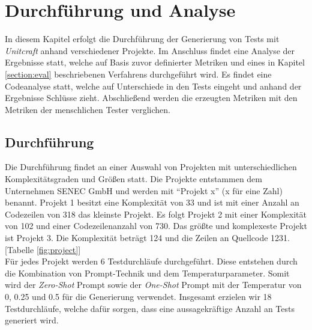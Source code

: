 \chapter{Durchführung und Analyse}
In diesem Kapitel erfolgt die Durchführung der Generierung von Tests mit \textit{Unitcraft} anhand verschiedener Projekte. Im Anschluss findet eine Analyse der Ergebnisse statt, welche auf Basis zuvor definierter Metriken und eines in Kapitel \ref{section:eval} beschriebenen Verfahrens durchgeführt wird. Es findet eine Codeanalyse statt, welche auf Unterschiede in den Tests eingeht und anhand der Ergebnisse Schlüsse zieht. Abschließend werden die erzeugten Metriken mit den Metriken der menschlichen Tester verglichen.

\section{Durchführung}
Die Durchführung findet an einer Auswahl von Projekten mit unterschiedlichen Komplexitätsgraden und Größen statt. Die Projekte entstammen dem Unternehmen SENEC GmbH und werden mit ``Projekt x'' (x für eine Zahl) benannt. Projekt 1 besitzt eine Komplexität von 33 und ist mit einer Anzahl an Codezeilen von 318 das kleinste Projekt. Es folgt Projekt 2 mit einer Komplexität von 102 und einer Codezeilenanzahl von 730. Das größte und komplexeste Projekt ist Projekt 3. Die Komplexität beträgt 124 und die Zeilen an Quellcode 1231. [Tabelle \ref{fig:project}]\\Für jedes Projekt werden 6 Testdurchläufe durchgeführt. Diese entstehen durch die Kombination von Prompt-Technik und dem Temperaturparameter. Somit wird der \textit{Zero-Shot} Prompt sowie der \textit{One-Shot} Prompt mit der Temperatur von 0, 0.25 und 0.5 für die Generierung verwendet. Insgesamt erzielen wir 18 Testdurchläufe, welche dafür sorgen, dass eine aussagekräftige Anzahl an Tests generiert wird.

